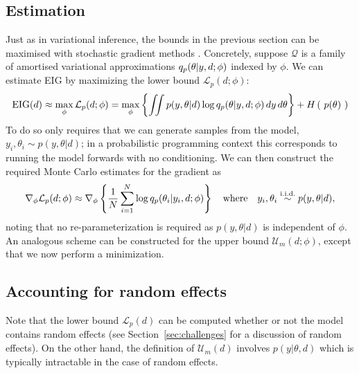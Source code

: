 \subsection{Estimation}
Just as in variational inference, the bounds in the previous section can be maximised with stochastic gradient methods \cite{robbins1951stochastic}. Concretely, suppose $\mathcal{Q}$ is a family of amortised variational approximations $q_p(\theta | y, d; \phi)$  indexed by $\phi$. We can estimate EIG by maximizing the lower bound $\mathcal{L}_p(d;\phi)$:
\begin{equation}
	\label{eq:maxpost}
	\text{EIG}(d) \approx \max_\phi \mathcal{L}_p(d;\phi) =
	\max_\phi \left\{ \iint p(y, \theta | d) \log q_p (\theta | y, d; \phi)\, dy\, d\theta  \right\} + H\left(\ p(\theta)\ \right)
\end{equation}
To do so only requires  that we can generate samples from the model,
$y_i, \theta_i \sim p(y, \theta | d)$; 
in a probabilistic programming context this corresponds to running the model forwards with no conditioning.
We can then construct the required Monte Carlo estimates for the gradient as
\begin{equation}
\nabla_{\phi} \mathcal{L}_p(d;\phi) \approx \nabla_\phi \left\{\frac{1}{N}\sum_{i=1}^N \log q_p(\theta_i|y_i, d; \phi)\right\} \quad \text{where} \quad y_i, \theta_i \overset{\tiny{\text{i.i.d.}}}{\sim} p(y, \theta | d),
\end{equation}
noting that no re-parameterization is required as $p(y,\theta|d)$ is independent of $\phi$.
An analogous scheme can be constructed for the upper bound $\mathcal{U}_m(d;\phi)$, except that we now
perform a minimization.


\subsection{Accounting for random effects}
Note that the lower bound $\mathcal{L}_p(d)$ can be computed whether or not the model contains random effects (see Section~\ref{sec:challenges} for a discussion of random effects). On the other hand, the definition of $\mathcal{U}_m(d)$ involves $p(y|\theta,d)$ which is typically intractable in the case of random effects.

